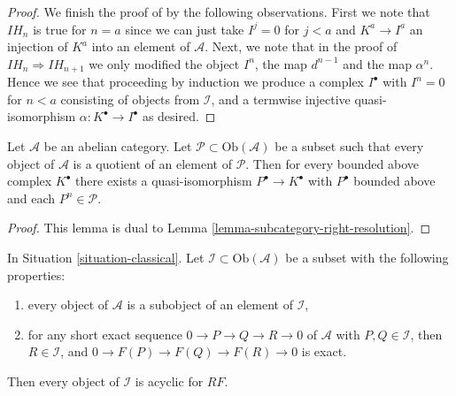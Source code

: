 \begin{proof}
\medskip\noindent
We finish the proof of by the following observations.
First we note that $IH_n$ is true for $n = a$ since
we can just take $I^j = 0$ for $j < a$ and $K^a \to I^a$ an injection
of $K^a$ into an element of $\mathcal{A}$.
Next, we note that in the proof of $IH_n \Rightarrow IH_{n + 1}$
we only modified the object $I^n$, the map $d^{n - 1}$ and
the map $\alpha^n$. Hence we see that proceeding by induction
we produce a complex $I^\bullet$ with $I^n = 0$ for $n < a$
consisting of objects from $\mathcal{I}$, and a termwise
injective quasi-isomorphism $\alpha : K^\bullet \to I^\bullet$ as desired.
\end{proof}

\begin{lemma}
\label{lemma-subcategory-left-resolution}
Let $\mathcal{A}$ be an abelian category.
Let $\mathcal{P} \subset \text{Ob}(\mathcal{A})$ be a subset such
that every object of $\mathcal{A}$ is a quotient of an element of
$\mathcal{P}$. Then for every bounded above complex $K^\bullet$
there exists a quasi-isomorphism $P^\bullet \to K^\bullet$
with $P^\bullet$ bounded above and each $P^n \in \mathcal{P}$.
\end{lemma}

\begin{proof}
This lemma is dual to
Lemma \ref{lemma-subcategory-right-resolution}.
\end{proof}

\begin{lemma}
\label{lemma-subcategory-right-acyclics}
In
Situation \ref{situation-classical}.
Let $\mathcal{I} \subset \text{Ob}(\mathcal{A})$ be a subset with the
following properties:
\begin{enumerate}
\item every object of $\mathcal{A}$ is a subobject of an element of
$\mathcal{I}$,
\item for any short exact sequence $0 \to P \to Q \to R \to 0$ of
$\mathcal{A}$ with $P, Q \in \mathcal{I}$, then $R \in \mathcal{I}$,
and $0 \to F(P) \to F(Q) \to F(R) \to 0$ is exact.
\end{enumerate}
Then every object of $\mathcal{I}$ is acyclic for $RF$.
\end{lemma}

